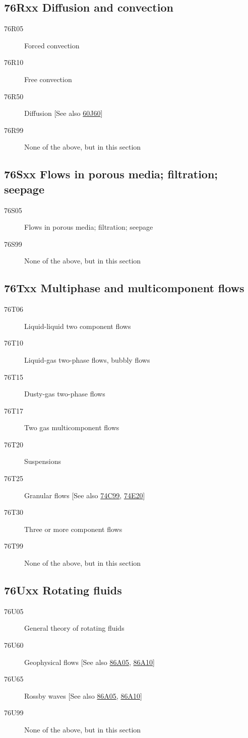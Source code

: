 \subsection*{76Rxx  Diffusion and convection }\label{76Rxx}
\begin{description}  
\item [76R05]\label{76R05} Forced convection
\item [76R10]\label{76R10} Free convection
\item [76R50]\label{76R50} Diffusion [See also \hyperref[60J60]{60J60}]
\item [76R99]\label{76R99} None of the above, but in this section
\end{description}
\subsection*{76Sxx  Flows in porous media; filtration; seepage }\label{76Sxx}
\begin{description}  
\item [76S05]\label{76S05} Flows in porous media; filtration; seepage
\item [76S99]\label{76S99} None of the above, but in this section
\end{description}
\subsection*{76Txx  Multiphase and multicomponent flows }\label{76Txx}
\begin{description}  
\item [76T06]\label{76T06} Liquid-liquid two component flows
\item [76T10]\label{76T10} Liquid-gas two-phase flows, bubbly flows
\item [76T15]\label{76T15} Dusty-gas two-phase flows
\item [76T17]\label{76T17} Two gas multicomponent flows
\item [76T20]\label{76T20} Suspensions
\item [76T25]\label{76T25} Granular flows [See also \hyperref[74C99]{74C99}, \hyperref[74E20]{74E20}]
\item [76T30]\label{76T30} Three or more component flows
\item [76T99]\label{76T99} None of the above, but in this section
\end{description}
\subsection*{76Uxx  Rotating fluids }\label{76Uxx}
\begin{description}  
\item [76U05]\label{76U05} General theory of rotating fluids
\item [76U60]\label{76U60} Geophysical flows [See also \hyperref[86A05]{86A05}, \hyperref[86A10]{86A10}]
\item [76U65]\label{76U65} Rossby waves  [See also \hyperref[86A05]{86A05}, \hyperref[86A10]{86A10}]
\item [76U99]\label{76U99} None of the above, but in this section
\end{description}
